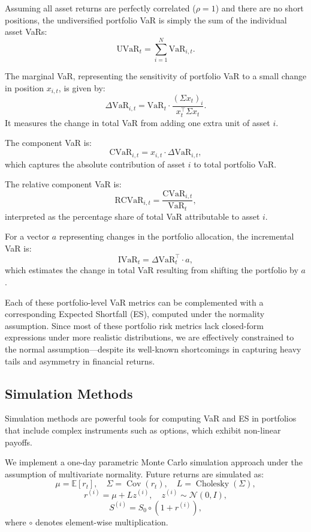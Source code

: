 \documentclass[12pt]{article}
\begin{document}
Assuming all asset returns are perfectly correlated (\( \rho = 1 \)) and there are no short positions, the undiversified portfolio VaR is simply the sum of the individual asset VaRs:
\[
  \text{UVaR}_t = \sum_{i=1}^N \text{VaR}_{i,t}.
\]

The marginal VaR, representing the sensitivity of portfolio VaR to a small change in position \( x_{i,t} \), is given by:
\[
  \Delta \text{VaR}_{i,t} = \text{VaR}_t \cdot \frac{(\Sigma x_t)_i}{x_t^\top \Sigma x_t}.
\]
It measures the change in total VaR from adding one extra unit of asset \( i \).

The component VaR is:
\[
  \text{CVaR}_{i,t} = x_{i,t} \cdot \Delta \text{VaR}_{i,t},
\]
which captures the absolute contribution of asset \( i \) to total portfolio VaR.

The relative component VaR is:
\[
  \text{RCVaR}_{i,t} = \frac{\text{CVaR}_{i,t}}{\text{VaR}_t},
\]
interpreted as the percentage share of total VaR attributable to asset \( i \).

For a vector \( a \) representing changes in the portfolio allocation, the incremental VaR is:
\[
  \text{IVaR}_t = \Delta \text{VaR}_t^\top \cdot a,
\]
which estimates the change in total VaR resulting from shifting the portfolio by \( a \).

Each of these portfolio-level VaR metrics can be complemented with a corresponding Expected Shortfall (ES), computed under the normality assumption.
Since most of these portfolio risk metrics lack closed-form expressions under more realistic distributions, we are effectively constrained to the normal assumption—despite its well-known shortcomings in capturing heavy tails and asymmetry in financial returns.

\subsection{Simulation Methods}

Simulation methods are powerful tools for computing VaR and ES in portfolios that include complex instruments such as options, which exhibit non-linear payoffs.

We implement a one-day parametric Monte Carlo simulation approach under the assumption of multivariate normality. Future returns are simulated as:
\[
\mu = \mathbb{E}[r_t], \quad \Sigma = \operatorname{Cov}(r_t), \quad L = \operatorname{Cholesky}(\Sigma),
\]
\[
r^{(i)} = \mu + L z^{(i)}, \quad z^{(i)} \sim \mathcal{N}(0, I),
\]
\[
S^{(i)} = S_0 \circ (1 + r^{(i)}),
\]
where \( \circ \) denotes element-wise multiplication.
\end{document}
